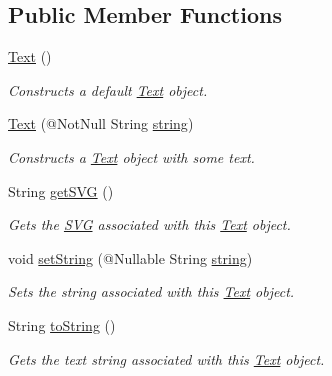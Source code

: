 \subsection*{Public Member Functions}
\begin{DoxyCompactItemize}
\item 
\hyperlink{classcom_1_1aarrelaakso_1_1drawl_1_1_text_a9d9bdd3df91ff551c7bf96f741cde0e9}{Text} ()
\begin{DoxyCompactList}\small\item\em Constructs a default \hyperlink{classcom_1_1aarrelaakso_1_1drawl_1_1_text}{Text} object. \end{DoxyCompactList}\item 
\hyperlink{classcom_1_1aarrelaakso_1_1drawl_1_1_text_a5ed8ace51c474771273958290af944de}{Text} (@Not\+Null String \hyperlink{classcom_1_1aarrelaakso_1_1drawl_1_1_text_a94bf15b06c72349f5d5a1bfc56496685}{string})
\begin{DoxyCompactList}\small\item\em Constructs a \hyperlink{classcom_1_1aarrelaakso_1_1drawl_1_1_text}{Text} object with some text. \end{DoxyCompactList}\item 
String \hyperlink{classcom_1_1aarrelaakso_1_1drawl_1_1_text_ab1a6091b007ea4da41de26bc8c6ea021}{get\+S\+VG} ()
\begin{DoxyCompactList}\small\item\em Gets the \hyperlink{classcom_1_1aarrelaakso_1_1drawl_1_1_s_v_g}{S\+VG} associated with this \hyperlink{classcom_1_1aarrelaakso_1_1drawl_1_1_text}{Text} object. \end{DoxyCompactList}\item 
void \hyperlink{classcom_1_1aarrelaakso_1_1drawl_1_1_text_a03668d250e9a1e99b9fa9214fdc40856}{set\+String} (@Nullable String \hyperlink{classcom_1_1aarrelaakso_1_1drawl_1_1_text_a94bf15b06c72349f5d5a1bfc56496685}{string})
\begin{DoxyCompactList}\small\item\em Sets the string associated with this \hyperlink{classcom_1_1aarrelaakso_1_1drawl_1_1_text}{Text} object. \end{DoxyCompactList}\item 
String \hyperlink{classcom_1_1aarrelaakso_1_1drawl_1_1_text_aaded65428b035e05b91e65f21808b434}{to\+String} ()
\begin{DoxyCompactList}\small\item\em Gets the text string associated with this \hyperlink{classcom_1_1aarrelaakso_1_1drawl_1_1_text}{Text} object. \end{DoxyCompactList}\item 

\end{DoxyCompactItemize}
